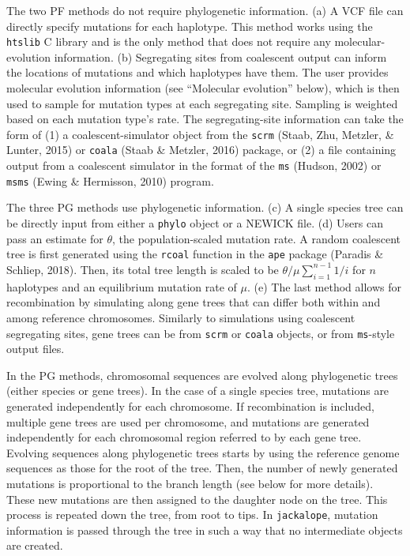 \documentclass[12pt,]{article}
\begin{document}
The two PF methods do not require phylogenetic information.
(a) A VCF file can directly specify mutations for each haplotype.
This method works using the \texttt{htslib} C library and
is the only method that does not require any molecular-evolution information.
(b) Segregating sites from coalescent output can inform the locations of mutations
and which haplotypes have them.
The user provides molecular evolution information (see ``Molecular evolution'' below),
which is then used to sample for mutation types at each segregating site.
Sampling is weighted based on each mutation type's rate.
The segregating-site information can take the form of
(1) a coalescent-simulator object from the \texttt{scrm}
(Staab, Zhu, Metzler, \& Lunter, 2015) or
\texttt{coala} (Staab \& Metzler, 2016) package, or
(2) a file containing output from a coalescent simulator in the format of the
\texttt{ms} (Hudson, 2002) or \texttt{msms} (Ewing \& Hermisson, 2010) program.

The three PG methods use phylogenetic information.
(c) A single species tree can be directly input from either
a \texttt{phylo} object or a NEWICK file.
(d) Users can pass an estimate for \(\theta\), the population-scaled mutation rate.
A random coalescent tree is first generated using the \texttt{rcoal} function
in the \texttt{ape} package (Paradis \& Schliep, 2018).
Then, its total tree length is scaled to be
\(\theta / \mu \sum_{i=1}^{n-1}{1 / i}\) for \(n\) haplotypes and an equilibrium
mutation rate of \(\mu\).
(e) The last method allows for recombination by simulating along
gene trees that can differ both within and among reference chromosomes.
Similarly to simulations using coalescent segregating sites, gene trees can be
from \texttt{scrm} or \texttt{coala} objects, or from \texttt{ms}-style output files.

In the PG methods, chromosomal sequences are evolved along
phylogenetic trees (either species or gene trees).
In the case of a single species tree, mutations are generated independently for
each chromosome.
If recombination is included, multiple gene trees are used per chromosome, and
mutations are generated independently for each chromosomal region referred to by
each gene tree.
Evolving sequences along phylogenetic trees starts by
using the reference genome sequences as those for the root of the tree.
Then, the number of newly generated mutations is
proportional to the branch length (see below for more details).
These new mutations are then assigned to the daughter node on the tree.
This process is repeated down the tree, from root to tips.
In \texttt{jackalope}, mutation information is passed through the tree in such a
way that no intermediate objects are created.
\end{document}

